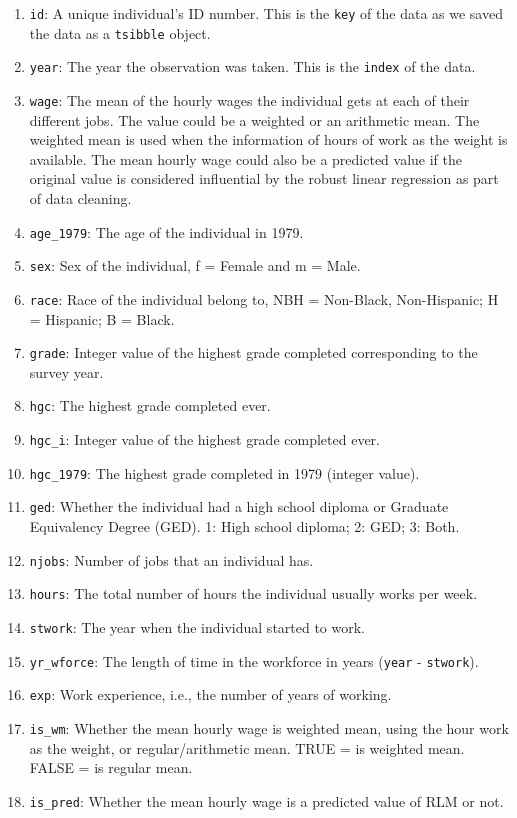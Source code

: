 \documentclass[12pt]{article}
\begin{document}
\begin{enumerate}
\def\labelenumi{\arabic{enumi}.}
\item
  \texttt{id}: A unique individual's ID number. This is the \texttt{key} of the data as we saved the data as a \texttt{tsibble} object.
\item
  \texttt{year}: The year the observation was taken. This is the \texttt{index} of the data.
\item
  \texttt{wage}: The mean of the hourly wages the individual gets at each of their different jobs. The value could be a weighted or an arithmetic mean. The weighted mean is used when the information of hours of work as the weight is available. The mean hourly wage could also be a predicted value if the original value is considered influential by the robust linear regression as part of data cleaning.
\item
  \texttt{age\_1979}: The age of the individual in 1979.
\item
  \texttt{sex}: Sex of the individual, f = Female and m = Male.
\item
  \texttt{race}: Race of the individual belong to, NBH = Non-Black, Non-Hispanic; H = Hispanic; B = Black.
\item
  \texttt{grade}: Integer value of the highest grade completed corresponding to the survey year.
\item
  \texttt{hgc}: The highest grade completed ever.
\item
  \texttt{hgc\_i}: Integer value of the highest grade completed ever.
\item
  \texttt{hgc\_1979}: The highest grade completed in 1979 (integer value).
\item
  \texttt{ged}: Whether the individual had a high school diploma or Graduate Equivalency Degree (GED). 1: High school diploma; 2: GED; 3: Both.
\item
  \texttt{njobs}: Number of jobs that an individual has.
\item
  \texttt{hours}: The total number of hours the individual usually works per week.
\item
  \texttt{stwork}: The year when the individual started to work.
\item
  \texttt{yr\_wforce}: The length of time in the workforce in years (\texttt{year} - \texttt{stwork}).
\item
  \texttt{exp}: Work experience, i.e., the number of years of working.
\item
  \texttt{is\_wm}: Whether the mean hourly wage is weighted mean, using the hour work as the weight, or regular/arithmetic mean. TRUE = is weighted mean. FALSE = is regular mean.
\item
  \texttt{is\_pred}: Whether the mean hourly wage is a predicted value of RLM or not.
\end{enumerate}
\end{document}
